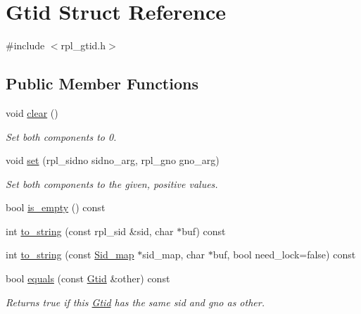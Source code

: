 \hypertarget{structGtid}{}\section{Gtid Struct Reference}
\label{structGtid}


{\ttfamily \#include $<$rpl\+\_\+gtid.\+h$>$}

\subsection*{Public Member Functions}
\begin{DoxyCompactItemize}
\item 
\mbox{\label{structGtid_a459c77dd4b1918fa7760fa5b0588ce79}} 
void \mbox{\hyperlink{structGtid_a459c77dd4b1918fa7760fa5b0588ce79}{clear}} ()
\begin{DoxyCompactList}\small\item\em Set both components to 0. \end{DoxyCompactList}\item 
\mbox{\label{structGtid_a4468f835ae0004ae796314ee5cded0bd}} 
void \mbox{\hyperlink{structGtid_a4468f835ae0004ae796314ee5cded0bd}{set}} (rpl\+\_\+sidno sidno\+\_\+arg, rpl\+\_\+gno gno\+\_\+arg)
\begin{DoxyCompactList}\small\item\em Set both components to the given, positive values. \end{DoxyCompactList}\item 
bool \mbox{\hyperlink{structGtid_a36b73175b879388152c746453ee2b87a}{is\+\_\+empty}} () const
\item 
int \mbox{\hyperlink{structGtid_afd7d2616cf9263cd09d25b6cd645ea4d}{to\+\_\+string}} (const rpl\+\_\+sid \&sid, char $\ast$buf) const
\item 
int \mbox{\hyperlink{structGtid_a21681faf43d58e6ef4e12323df2c0779}{to\+\_\+string}} (const \mbox{\hyperlink{classSid__map}{Sid\+\_\+map}} $\ast$sid\+\_\+map, char $\ast$buf, bool need\+\_\+lock=false) const
\item 
\mbox{\label{structGtid_ade3afc807d50c3c11d78a7bedb1e2b3e}} 
bool \mbox{\hyperlink{structGtid_ade3afc807d50c3c11d78a7bedb1e2b3e}{equals}} (const \mbox{\hyperlink{structGtid}{Gtid}} \&other) const
\begin{DoxyCompactList}\small\item\em Returns true if this \mbox{\hyperlink{structGtid}{Gtid}} has the same sid and gno as \textquotesingle{}other\textquotesingle{}. \end{DoxyCompactList}\item 

\end{DoxyCompactItemize}
